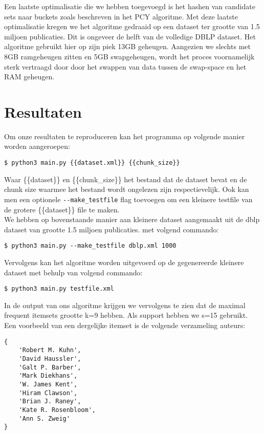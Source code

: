 \documentclass[11pt]{article}
\begin{document}
Een laatste optimalisatie die we hebben toegevoegd is het hashen van candidate sets naar buckets zoals beschreven in het PCY algoritme. Met deze laatste optimalisatie kregen we het algoritme gedraaid op een dataset ter grootte van 1.5 miljoen publicaties. Dit is ongeveer de helft van de volledige DBLP dataset. Het algoritme gebruikt hier op zijn piek 13GB geheugen. Aangezien we slechts met 8GB ramgeheugen zitten en 5GB swapgeheugen, wordt het proces voornamelijk sterk vertraagd door door het swappen van data tussen de swap-space en het RAM geheugen. 


\section{Resultaten}

Om onze resultaten te reproduceren kan het programma op volgende manier worden aangeroepen:

\begin{verbatim}
$ python3 main.py {{dataset.xml}} {{chunk_size}}
\end{verbatim}

Waar \{\{dataset\}\} en \{\{chunk\_size\}\} het bestand dat de dataset bevat en de chunk size waarmee het bestand wordt ongelezen zijn respectievelijk. Ook kan men een optionele \texttt{-{}-make\_testfile} flag toevoegen om een kleinere testfile van de grotere \{\{dataset\}\} file te maken.\\

We hebben op bovenstaande manier aan kleinere dataset aangemaakt uit de dblp dataset van grootte 1.5 miljoen publicaties. met volgend commando:

\begin{verbatim}
$ python3 main.py --make_testfile dblp.xml 1000 
\end{verbatim}

Vervolgens kan het algoritme worden uitgevoerd op de gegenereerde kleinere dataset met behulp van volgend commando:

\begin{verbatim}
$ python3 main.py testfile.xml 
\end{verbatim}

In de output van ons algoritme krijgen we vervolgens te zien dat de maximal frequent itemsets grootte k=9 hebben. Als support hebben we s=15 gebruikt. Een voorbeeld van een dergelijke itemset is de volgende verzameling auteurs: 

\begin{verbatim}
{
    'Robert M. Kuhn', 
    'David Haussler', 
    'Galt P. Barber', 
    'Mark Diekhans',
    'W. James Kent', 
    'Hiram Clawson',
    'Brian J. Raney',
    'Kate R. Rosenbloom',
    'Ann S. Zweig'
}
\end{verbatim}
\end{document}
